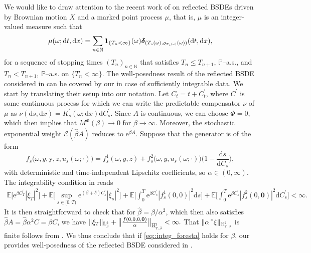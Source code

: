 \documentclass[10pt]{article} %
\newcommand\cE{\mathcal E}
\newcommand{\smalltext}[1]{\text{\fontsize{4}{4}\selectfont$#1$}}
\newcommand{\tinytext}[1]{\text{\fontsize{3}{3}\selectfont$#1$}}
\def \E{\mathbb{E}}
\def \H{\mathbb{H}}
\def \L{\mathbb{L}}
\def \N{\mathbb{N}}
\def \P{\mathbb{P}}
\newcommand{\brs}[1]{\prescript{\ast}{}{#1}}
\newcommand{\1}{\mathbf{1}}
\def\d{\mathrm{d}}
\begin{document}
We would like to draw attention to the recent work of \citeauthor*{foresta2021optimal} \cite{foresta2021optimal} on reflected BSDEs driven by Brownian motion $X$ and a marked point process $\mu$, that is, $\mu$ is an integer-valued measure such that
\begin{equation*}
	\mu(\omega; \d t, \d x) = \sum_{n \in \N} \mathbf{1}_{\{T_n < \infty\}}(\omega)\boldsymbol{\delta}_{(T_\smalltext{n}(\omega),\varrho_{\smalltext{T}_\tinytext{n}\smalltext{(}\smalltext{\omega}\smalltext{)}}(\omega))}(\d t, \d x),
\end{equation*}
for a sequence of stopping times $(T_n)_{n \in \N}$ that satisfies $T_n \leq T_{n+1}$, $\P$--a.s., and $T_n < T_{n+1}$, $\P$--a.s. on $\{T_n < \infty\}$. The well-posedness result of the reflected BSDE considered in \cite[Theorem 4.1]{foresta2021optimal} can be covered by our  in case of sufficiently integrable data. We start by translating their setup into our notation. Let $C_t = t + C^\prime_t$, where $C^\prime$ is some continuous process for which we can write the predictable compensator $\nu$ of $\mu$ as $\nu(\d s,\d x) = K^\prime_s(\omega;\d x) \d C^\prime_s$. Since $A$ is continuous, we can choose $\Phi = 0$, which then implies that $M^\Phi(\beta) \longrightarrow 0$ for $\beta \longrightarrow \infty$. Moreover, the stochastic exponential weight $\cE(\hat\beta A)$ reduces to $\mathrm{e}^{\hat\beta A}$. Suppose that the generator is of the form
\begin{equation*}
	f_s\big(\omega,y,\mathrm{y},z,u_s(\omega;\cdot)\big) =f^1_s(\omega,y,z) + f^2_s\big(\omega,y,u_s(\omega;\cdot)\big)\bigg(1- \frac{\d s}{\d C_s}\bigg),
\end{equation*}
 with deterministic and time-independent Lipschitz coefficients, so $\alpha \in (0,\infty)$.
The integrability condition in \cite{foresta2021optimal} reads
\begin{align}\label{eq::integ_foresta}
	\E\bigg[ \mathrm{e}^{\beta C^\prime_T} |\xi_T|^2\bigg] + \E\bigg[\sup_{s \in [0,T)} \mathrm{e}^{(\beta +\delta)C^\prime_s} |\xi_s|^2\bigg] + \E\bigg[\int_0^T \mathrm{e}^{\beta C^\prime_s}|f^1_s(0,0)|^2 \d s\bigg] + \E\bigg[\int_0^T \mathrm{e}^{\beta C^\prime_s}|f^2_s(0,\mathbf{0})|^2 \d C^\prime_s\bigg] <\infty.
\end{align}
It is then straightforward to check that for $\hat\beta = \beta/\alpha^2$, which then also satisfies $\hat\beta A = \hat\beta \alpha^2 C = \beta C$, we have $\|\xi_T\|_{\L^\smalltext{2}_\smalltext{\hat\beta}} + \big\|\frac{f(0,0,0,\mathbf{0})}{\alpha}\big\|_{\H^\smalltext{2}_{\smalltext{T}\smalltext{,}\smalltext{\hat\beta}}}  < \infty.$ That $\|\alpha \brs{\xi}\|_{\H^\smalltext{2}_{\smalltext{T}\smalltext{,}\smalltext{\hat\beta}}}$ is finite follows from . We thus conclude that if \eqref{eq::integ_foresta} holds for $\beta$, our  provides well-posedness of the reflected BSDE considered in \cite{foresta2021optimal}.
\end{document}
